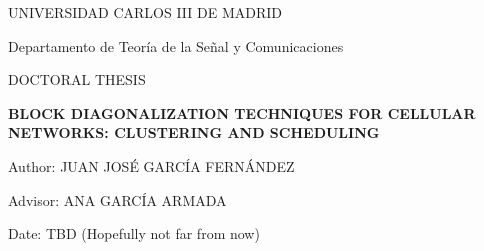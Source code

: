 {\Large



\centerline{UNIVERSIDAD CARLOS III DE MADRID}

\centerline{Departamento de Teoría de la Señal y Comunicaciones}


\vspace*{2.5cm}
\centerline{DOCTORAL THESIS}

\vspace*{1cm}
\begin{center}
{\bf
	BLOCK DIAGONALIZATION TECHNIQUES FOR CELLULAR NETWORKS: CLUSTERING AND SCHEDULING
}
\end{center}

\vspace*{3cm}
Author: JUAN JOSÉ GARCÍA FERNÁNDEZ

Advisor: ANA GARCÍA ARMADA

Date: TBD (Hopefully not far from now)

} %
